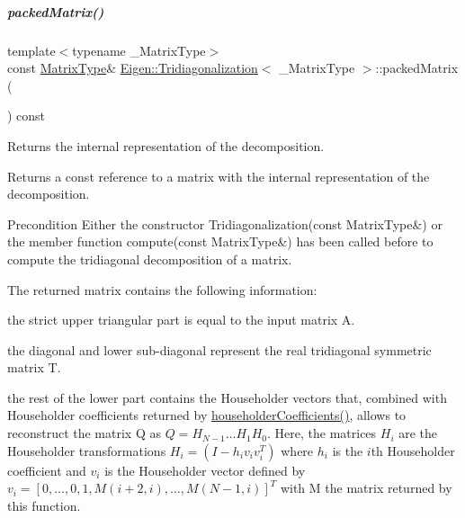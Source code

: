 \mbox{\label{group___eigenvalues___module_a47858b3895e64acafb1bb2e97f98a154}} 
\subparagraph{\texorpdfstring{packed\+Matrix()}{packedMatrix()}\hspace{0.1cm}{\footnotesize\ttfamily [2/2]}}
{\footnotesize\ttfamily template$<$typename \+\_\+\+Matrix\+Type$>$ \\
const \hyperlink{group___eigenvalues___module_add0f4b2216d0ea8ee0f7d8525deaf0a9}{Matrix\+Type}\& \hyperlink{group___eigenvalues___module_class_eigen_1_1_tridiagonalization}{Eigen\+::\+Tridiagonalization}$<$ \+\_\+\+Matrix\+Type $>$\+::packed\+Matrix (\begin{DoxyParamCaption}{ }\end{DoxyParamCaption}) const\hspace{0.3cm}{\ttfamily [inline]}}



Returns the internal representation of the decomposition. 

\begin{DoxyReturn}{Returns}
a const reference to a matrix with the internal representation of the decomposition.
\end{DoxyReturn}
\begin{DoxyPrecond}{Precondition}
Either the constructor Tridiagonalization(const Matrix\+Type\&) or the member function compute(const Matrix\+Type\&) has been called before to compute the tridiagonal decomposition of a matrix.
\end{DoxyPrecond}
The returned matrix contains the following information\+:
\begin{DoxyItemize}
\item the strict upper triangular part is equal to the input matrix A.
\item the diagonal and lower sub-\/diagonal represent the real tridiagonal symmetric matrix T.
\item the rest of the lower part contains the Householder vectors that, combined with Householder coefficients returned by \hyperlink{group___eigenvalues___module_ac95b4e43dcf6c3c5074b8bea4fc67887}{householder\+Coefficients()}, allows to reconstruct the matrix Q as $ Q = H_{N-1} \ldots H_1 H_0 $. Here, the matrices $ H_i $ are the Householder transformations $ H_i = (I - h_i v_i v_i^T) $ where $ h_i $ is the $ i $th Householder coefficient and $ v_i $ is the Householder vector defined by $ v_i = [ 0, \ldots, 0, 1, M(i+2,i), \ldots, M(N-1,i) ]^T $ with M the matrix returned by this function.
\end{DoxyItemize}

